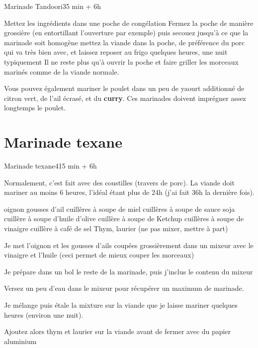 {\begin{recette}{Marinade Tandoori}{3}{5 min + 6h}{}
\begin{preparation}
\etape Mettez les ingrédients dans une poche de congélation
\etape Fermez la poche de manière grossière (en entortillant l'ouverture par exemple) puis secouez jusqu'à ce que la marinade 
soit homogène
\etape mettez la viande dans la poche, de préférence du porc qui va très bien avec, et laissez reposer au frigo quelques heures, 
une nuit typiquement
\etape Il ne reste plus qu'à ouvrir la poche et faire griller les morceaux marinés comme de la viande normale.
\end{preparation}

\begin{remarque}
Vous pouvez également mariner le poulet dans un peu de yaourt additionné de citron vert, de l'ail écrasé, et du \textbf{curry}. 
Ces marinades doivent imprégner assez longtemps le poulet.
\end{remarque}

\end{recette}

\section{Marinade texane}\label{sec:travers_texane}
\begin{recette}{Marinade texane}{4}{15 min + 6h}{}
\begin{remarque}
Normalement, c'est fait avec des coustilles (travers de porc). La viande doit mariner au moins 6 heures, l'idéal étant plus de 24h (j'ai fait 36h la dernière fois).
\end{remarque}
\begin{ingredients}
 oignon
 gousses d'ail
 cuillères à soupe de miel
 cuillères à soupe de sauce soja
 cuillère à soupe d'huile d'olive
 cuillère à soupe de Ketchup
 cuillères à soupe de vinaigre
 cuillère à café de sel
\ingredient Thym, laurier (ne pas mixer, mettre à part)
\end{ingredients}

\begin{preparation}
\item Je met l'oignon et les gousses d'ails coupées grossièrement dans un mixeur avec le vinaigre et l'huile (ceci permet de 
mieux couper les morceaux)
\item Je prépare dans un bol le reste de la marinade, puis j'inclus le contenu du mixeur
\item Versez un peu d'eau dans le mixeur pour récupérer un maximum de marinade.
\item Je mélange puis étale la mixture sur la viande que je laisse mariner quelques heures (environ une nuit).
\item Ajoutez alors thym et laurier sur la viande avant de fermer avec du papier aluminium
\end{preparation}


\end{recette}}
